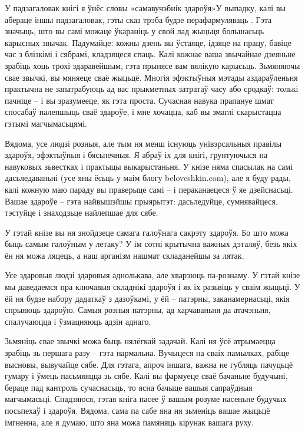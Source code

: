 У падзагаловак кнігі я ўнёс словы «самавучэбнік здароўя»У выпадку, калі вы абераце іншы падзагаловак, гэты сказ трэба будзе перафармуляваць . Гэта значыць, што вы самі можаце ўкараніць у свой лад жыцьця большасьць карысных звычак. Падумайце: кожны дзень вы ўстаяце, ідзяце на працу, бавіце час з блізкімі і сябрамі, кладзяцеся спаць. Калі кожнае ваша звычайнае дзеяньне зрабіць хоць трохі здаравейшым, гэта прынясе вам вялікую карысьць. Зьмяняючы свае звычкі, вы мяняеце сваё жыцьцё. Многія эфэктыўныя мэтады аздараўленьня практычна не запатрабуюць ад вас прыкметных затратаў часу або сродкаў: толькі пачніце – і вы зразумееце, як гэта проста. Сучасная навука прапануе шмат спосабаў палепшыць сваё здароўе, і мне хочацца, каб вы змаглі скарыстацца гэтымі магчымасьцямі.

Вядома, усе людзі розныя, але тым ня менш існуюць унівэрсальныя правілы здароўя, эфэктыўныя і бясьпечныя. Я абраў іх для кнігі, грунтуючыся на навуковых зьвестках і практыцы выкарыстаньня. У кнізе няма спасылак на самі дасьледаваньні (усе яны ёсьць у маім блогу beloveshkin.com), але я буду рады, калі кожную маю параду вы праверыце самі – і пераканаецеся ў яе дзейснасьці. Вашае здароўе – гэта найвышэйшы прыярытэт: дасьледуйце, сумнявайцеся, тэстуйце і знаходзьце найлепшае для сябе.

У гэтай кнізе вы ня знойдзеце самага галоўнага сакрэту здароўя. Бо што можа быць самым галоўным у летаку? У ім сотні крытычна важных дэталяў, безь якіх ён ня можа ляцець, а наш арганізм нашмат складанейшы за лятак.

Усе здаровыя людзі здаровыя аднолькава, але хварэюць па-рознаму. У гэтай кнізе мы даведаемся пра ключавыя складнікі здароўя і як іх разьвіць у сваім жыцьці. У ёй ня будзе набору дадаткаў з дазоўкамі, у ёй – патэрны, заканамернасьці, якія спрыяюць здароўю. Самыя розныя патэрны, ад харчаваньня да атачэньня, спалучаюцца і ўзмацняюць адзін аднаго.

Зьмяніць свае звычкі можа быць нялёгкай задачай. Калі ня ўсё атрымаецца зрабіць зь першага разу – гэта нармальна. Вучыцеся на сваіх памылках, рабіце высновы, вывучайце сябе. Для гэтага, апроч іншага, важна не губляць пачуцьцё гумару і ўмець пасьмяяцца зь сябе. Калі вы фармуеце сваё бачаньне будучыні, бераце пад кантроль сучаснасьць, то ясна бачыце вашыя сапраўдныя магчымасьці. Спадзяюся, гэтая кніга пасее ў вашым розуме насеньне будучых посьпехаў і здароўя. Вядома, сама па сабе яна ня зьменіць вашае жыцьцё імгненна, але я думаю, што яна можа памяняць кірунак вашага руху. 

